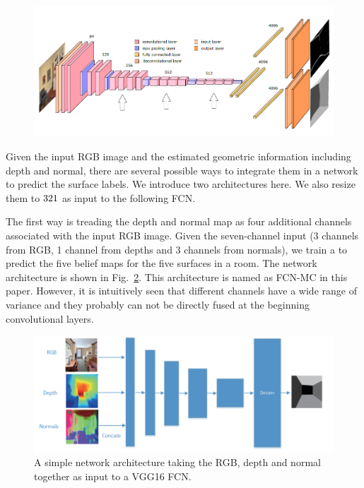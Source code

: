 \begin{figure}
	\centering
	\includegraphics[width=\columnwidth]{figure/coarse-to-fine-net.png}
	\label{fig:coarsetofine}
\end{figure}

Given the input RGB image and the estimated geometric information including depth and normal, there are several possible ways to integrate them in a network to predict the surface labels. We introduce two architectures here.
We also resize them to $321 \time 321$ as input to the following FCN. 

The first way is treading the depth and normal map as four additional channels associated with the input RGB image. Given the seven-channel input (3 channels from RGB, 1 channel from depths and 3 channels from normals), we train a  to predict the five belief maps for the five surfaces in a room. The network architecture is shown in Fig.~\ref{fig:fcn-multi-channel}. This architecture is named as FCN-MC in this paper. 
%
However, it is intuitively seen that different channels have a wide range of variance and they probably can not be directly fused at the beginning convolutional layers. 

\begin{figure}
	\centering
	\includegraphics[width=\columnwidth]{figure/fcn-multi-channel.png}
	\caption{A simple network architecture taking the RGB, depth and normal together as input to a VGG16 FCN. }
	\label{fig:fcn-multi-channel}
\end{figure}

